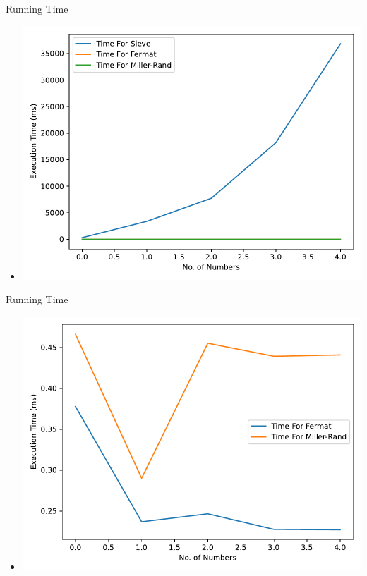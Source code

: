 \documentclass{beamer}
\begin{document}
\begin{frame}{Running Time}
    \begin{itemize}
        \item \includegraphics[width=\textwidth]{Fermat-Sieve-MillerRand.pdf}
    \end{itemize}
\end{frame}
\begin{frame}{Running Time}
    \begin{itemize}
        \item \includegraphics[width=\textwidth]{Fermat-MillerRand.pdf}
    \end{itemize}
\end{frame}
\end{document}
